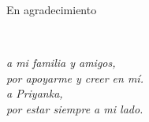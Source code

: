 \begin{minipage}{0.3\textwidth}
\begin{flushleft}
\vspace{4cm}
En agradecimiento

\end{flushleft}
\end{minipage}
~
\begin{minipage}{0.6\textwidth}
\begin{flushright}
\vspace{5cm}

\scriptsize
\emph{a mi familia y amigos,}\\
\emph{por apoyarme y creer en mí.}\\[1.5cm]

\emph{a Priyanka,}\\
\emph{por estar siempre a mi lado.}\\

\end{flushright}
\end{minipage}\\[2cm]
\vfill
